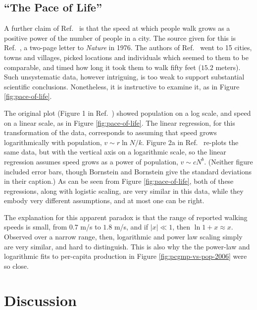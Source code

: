 \documentclass{pnastwo}
\begin{document}
\begin{article}
\subsection{``The Pace of Life''}
\label{sec:pace-of-life}

A further claim of Ref.\ \cite{Bettencout-et-al-growth-innovation-scaling} is
that the speed at which people walk grows as a positive power of the number of
people in a city.  The source given for this is Ref.\
\cite{Bornstein-Bornstein-pace-of-life}, a two-page letter to {\em Nature} in
1976.  The authors of Ref.\ \cite{Bornstein-Bornstein-pace-of-life} went to 15
cities, towns and villages, picked locations and individuals which seemed to
them to be comparable, and timed how long it took them to walk fifty feet
($15.2$ meters).  Such unsystematic data, however intriguing, is too weak to
support substantial scientific conclusions.  Nonetheless, it is instructive to
examine it, as in Figure \ref{fig:pace-of-life}.

The original plot (Figure 1 in Ref.\ \cite{Bornstein-Bornstein-pace-of-life})
showed population on a log scale, and speed on a linear scale, as in Figure
\ref{fig:pace-of-life}.  The linear regression, for this transformation of the
data, corresponds to assuming that speed grows logarithmically with population,
$v \sim r\ln{N/k}$.  Figure 2a in Ref.\
\cite{Bettencout-et-al-growth-innovation-scaling} re-plots the same data, but
with the vertical axis on a logarithmic scale, so the linear regression assumes
speed grows as a power of population, $v \sim c N^b$.  (Neither figure included
error bars, though Bornstein and Bornstein give the standard deviations in
their caption.)  As can be seen from Figure \ref{fig:pace-of-life}, both of
these regressions, along with logistic scaling, are very similar in this data,
while they embody very different assumptions, and at most one can be right.

The explanation for this apparent paradox is that the range of reported walking
speeds is small, from $0.7$ m/s to $1.8$ m/s, and if $|x| \ll 1$, then
$\ln{1+x} \approx x$.  Observed over a narrow range, then, logarithmic and
power law scaling simply are very similar, and hard to distinguish.  This is
also why the the power-law and logarithmic fits to per-capita production in
Figure \ref{fig:pcgmp-vs-pop-2006} were so close.


\section{Discussion}
\label{sec:conclusion}


\end{article}
\end{document}
